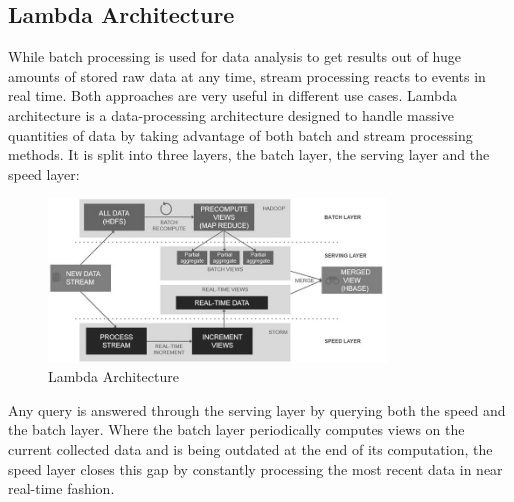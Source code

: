 
\subsection{Lambda Architecture}
While batch processing is used for data analysis to get results out of huge
amounts of stored raw data at any time, stream processing reacts to events in
real time. Both approaches are very useful in different use cases. Lambda
architecture is a data-processing architecture designed to handle massive
quantities of data by taking advantage of both batch and stream processing
methods. It is split into three layers, the batch layer, the serving layer and
the speed layer:

\begin{figure}[H]
    \centering
    \includegraphics[width=0.8\textwidth]{images/lambda-architecture.jpg}
    \caption{Lambda Architecture}
    \label{fig:lambda-Architecture}
\end{figure}

Any query is answered through the serving layer by querying both the speed and
the batch layer. Where the batch layer periodically computes views on the
current collected data and is being outdated at the end of its computation, the
speed layer closes this gap by constantly processing the most recent data in
near real-time fashion. \cite{marz2015big} \cite{PrpSvyOfDSPS}

